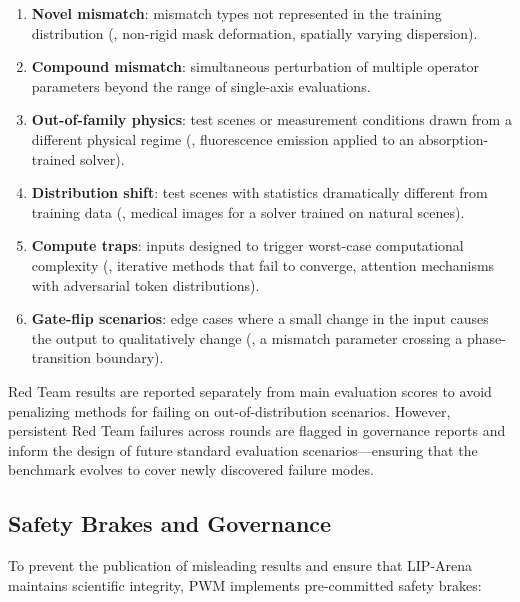 \begin{enumerate}
  \item \textbf{Novel mismatch}: mismatch types not represented in the
        training distribution (\eg, non-rigid mask deformation,
        spatially varying dispersion).
  \item \textbf{Compound mismatch}: simultaneous perturbation of
        multiple operator parameters beyond the range of single-axis
        evaluations.
  \item \textbf{Out-of-family physics}: test scenes or measurement
        conditions drawn from a different physical regime (\eg,
        fluorescence emission applied to an absorption-trained solver).
  \item \textbf{Distribution shift}: test scenes with statistics
        dramatically different from training data (\eg, medical
        images for a solver trained on natural scenes).
  \item \textbf{Compute traps}: inputs designed to trigger worst-case
        computational complexity (\eg, iterative methods that fail to
        converge, attention mechanisms with adversarial token
        distributions).
  \item \textbf{Gate-flip scenarios}: edge cases where a small change
        in the input causes the output to qualitatively change (\eg,
        a mismatch parameter crossing a phase-transition boundary).
\end{enumerate}

Red Team results are reported separately from main evaluation
scores to avoid penalizing methods for failing on out-of-distribution
scenarios.
However, persistent Red Team failures across rounds are flagged in
governance reports and inform the design of future standard
evaluation scenarios---ensuring that the benchmark evolves to cover
newly discovered failure modes.


\subsection{Safety Brakes and Governance}
\label{sec:safety}

To prevent the publication of misleading results and ensure that
LIP-Arena maintains scientific integrity, PWM implements pre-committed
safety brakes:

